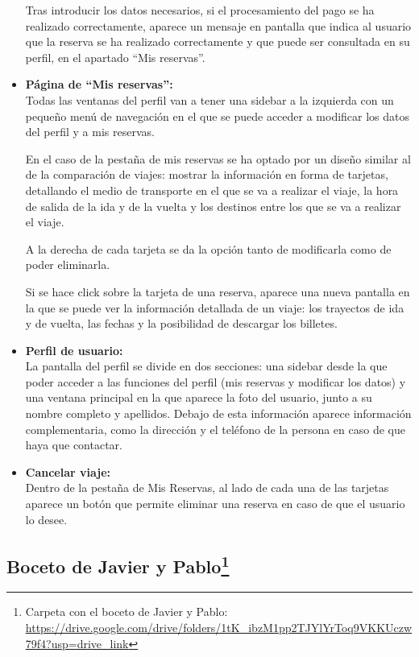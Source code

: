 \begin{itemize}
    Tras introducir los datos necesarios, si el procesamiento del pago se ha realizado correctamente, aparece un mensaje en pantalla que indica al usuario que la reserva se ha realizado correctamente y que puede ser consultada en su perfil, en el apartado “Mis reservas”.

    \item\textbf{Página de ``Mis reservas'':} \\ Todas las ventanas del perfil van a tener una sidebar a la izquierda con un pequeño menú de navegación en el que se puede acceder a modificar los datos del perfil y a mis reservas.

    En el caso de la pestaña de mis reservas se ha optado por un diseño similar al de la comparación de viajes: mostrar la información en forma de tarjetas, detallando el medio de transporte en el que se va a realizar el viaje, la hora de salida de la ida y de la vuelta y los destinos entre los que se va a realizar el viaje.

    A la derecha de cada tarjeta se da la opción tanto de modificarla como de poder eliminarla.

    Si se hace click sobre la tarjeta de una reserva, aparece una nueva pantalla en la que se puede ver la información detallada de un viaje: los trayectos de ida y de vuelta, las fechas y la posibilidad de descargar los billetes.

    \item\textbf{Perfil de usuario:} \\ La pantalla del perfil se divide en dos secciones: una sidebar desde la que poder acceder a las funciones del perfil (mis reservas y modificar los datos) y una ventana principal en la que aparece la foto del usuario, junto a su nombre completo y apellidos. Debajo de esta información aparece información complementaria, como la dirección y el teléfono de la persona en caso de que haya que contactar.
    \item\textbf{Cancelar viaje:} \\ Dentro de la pestaña de Mis Reservas, al lado de cada una de las tarjetas aparece un botón que permite eliminar una reserva en caso de que el usuario lo desee.
\end{itemize}

\subsection[Boceto de Javier y Pablo]{Boceto de Javier y Pablo\footnote{Carpeta con el boceto de Javier y Pablo: \url{https://drive.google.com/drive/folders/1tK_ibzM1pp2TJYlYrToq9VKKUczw79f4?usp=drive_link}}}

